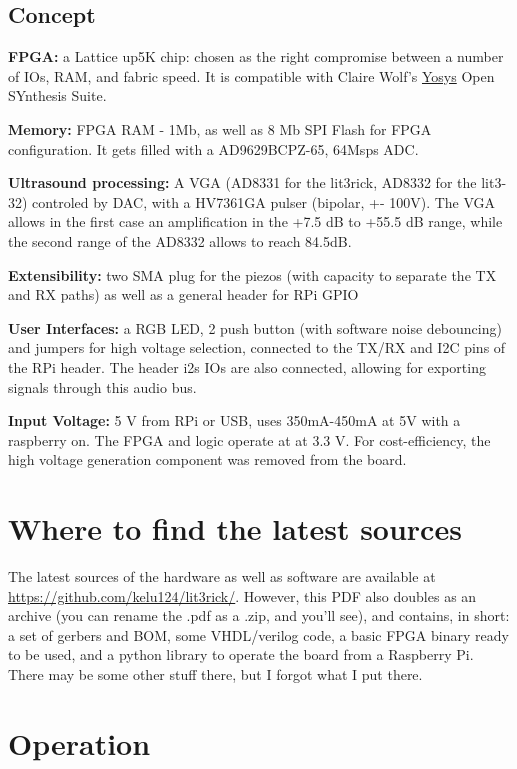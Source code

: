 \documentclass{article}
\begin{document}
\subsection{Concept}

\textbf{FPGA:} a Lattice up5K chip: chosen as the right compromise between a number of IOs, RAM, and fabric speed. It is compatible with Claire  Wolf's \href{http://www.clifford.at/yosys/}{Yosys} Open SYnthesis Suite. 

\textbf{Memory:}  FPGA RAM - 1Mb, as well as 8 Mb SPI Flash for FPGA configuration. It gets filled with a AD9629BCPZ-65, 64Msps ADC.

\textbf{Ultrasound processing: } A VGA (AD8331 for the lit3rick, AD8332 for the lit3-32) controled by DAC, with a HV7361GA pulser (bipolar, +- 100V). The VGA allows in the first case an amplification in the +7.5 dB to +55.5 dB range, while the second range of the AD8332 allows to reach 84.5dB.
        
\textbf{Extensibility:}  two SMA plug for the piezos (with capacity to separate the TX and RX paths) as well as a general header for RPi GPIO

\textbf{User Interfaces:} a RGB LED, 2 push button (with software noise debouncing) and jumpers for high voltage selection, connected to the TX/RX and I2C pins of the RPi header. The header i2s IOs are also connected, allowing for exporting signals through this audio bus.

\textbf{Input Voltage:} 5 V from RPi or USB, uses 350mA-450mA at 5V with a raspberry on. The FPGA and logic operate at at 3.3 V. For cost-efficiency, the high voltage generation component was removed from the board.

\section{Where to find the latest sources} 
 

The latest sources of the hardware as well as software are available at \url{https://github.com/kelu124/lit3rick/}. However, this PDF also doubles as an archive (you can rename the .pdf as a .zip, and you'll see), and contains, in short: a set of gerbers and BOM, some VHDL/verilog code, a basic FPGA binary ready to be used, and a python library to operate the board from a Raspberry Pi. There may be some other stuff there, but I forgot what I put there.

\section{Operation} 
\end{document}
